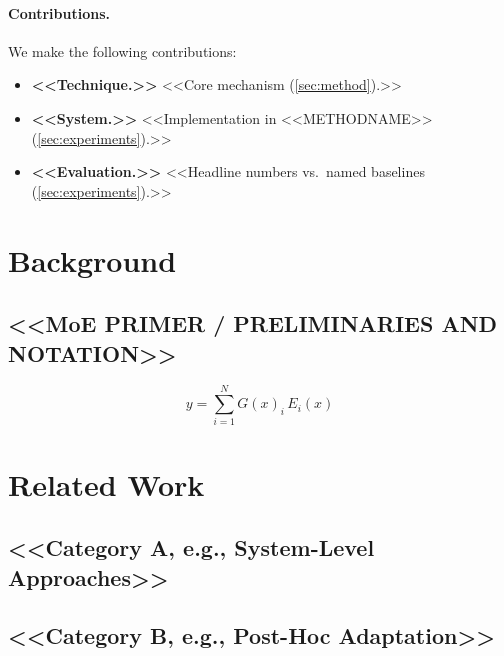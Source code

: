 \documentclass[10pt,letterpaper]{article}
\theoremstyle{plain}
\theoremstyle{definition}
\theoremstyle{remark}
\newcommand{\method}{\textsc{<<METHODNAME>>}\xspace}
\begin{document}
\paragraph{Contributions.}
We make the following contributions:
\begin{itemize}[leftmargin=1.5em]
  \item \textbf{<<Technique.>>} <<Core mechanism (\cref{sec:method}).>>
  \item \textbf{<<System.>>} <<Implementation in \method (\cref{sec:experiments}).>>
  \item \textbf{<<Evaluation.>>} <<Headline numbers vs.\ named baselines
        (\cref{sec:experiments}).>>
\end{itemize}

\section{Background}
\label{sec:background}
\subsection{<<MoE PRIMER / PRELIMINARIES AND NOTATION>>}
\begin{equation}
  y = \sum_{i=1}^{N} G(x)_i \, E_i(x)
  \label{eq:moe} %
\end{equation}

\section{Related Work}
\label{sec:related}
\subsection{<<Category A, e.g., System-Level Approaches>>}
\subsection{<<Category B, e.g., Post-Hoc Adaptation>>}
\end{document}
